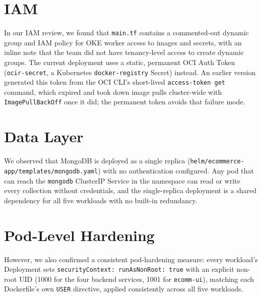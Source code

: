 \section{IAM}\label{sec:sec-iam}
In our IAM review, we found that \texttt{main.tf} contains a commented-out dynamic group and IAM policy for OKE
worker access to images and secrets, with an inline note that the team did not have
tenancy-level access to create dynamic groups. The current deployment uses a
static, permanent OCI Auth Token (\texttt{ocir-secret}, a Kubernetes
\texttt{docker-registry} Secret) instead. An earlier version generated this token
from the OCI CLI's short-lived \texttt{access-token get} command, which expired and
took down image pulls cluster-wide with \texttt{ImagePullBackOff} once it did; the
permanent token avoids that failure mode.

\section{Data Layer}\label{sec:sec-data}
We observed that MongoDB is deployed as a single replica
(\texttt{helm/ecommerce-app/\allowbreak templates/\allowbreak mongodb.yaml}) with no
authentication configured. Any pod that can reach the \texttt{mongodb} ClusterIP
Service in the namespace can read or write every collection without credentials, and
the single-replica deployment is a shared dependency for all five workloads with no
built-in redundancy.

\section{Pod-Level Hardening}\label{sec:sec-pod}
However, we also confirmed a consistent pod-hardening measure: every workload's
Deployment sets \texttt{securityContext: runAsNonRoot: true} with an
explicit non-root UID (1000 for the four backend services, 1001 for
\texttt{ecomm-ui}), matching each Dockerfile's own \texttt{USER} directive, applied
consistently across all five workloads.
